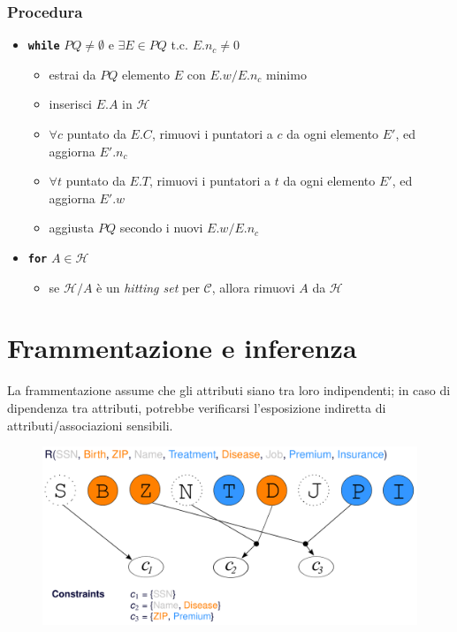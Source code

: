 \documentclass{report}
\begin{document}
\subsubsection{Procedura}
\begin{itemize}
    \item \texttt{\textbf{while}} $PQ \neq \emptyset$ e $\exists E \in PQ$ t.c. $E.n_c \neq 0$
    \begin{itemize}
        \item estrai da $PQ$ elemento $E$ con $E.w/E.n_c$ minimo 
        \item inserisci $E.A$ in $\mathcal{H}$
        \item $\forall c$ puntato da $E.C$, rimuovi i puntatori a $c$ da ogni elemento $E'$, ed aggiorna $E'.n_c$ 
        \item $\forall t$ puntato da $E.T$, rimuovi i puntatori a $t$ da ogni elemento $E'$, ed aggiorna $E'.w$
        \item aggiusta $PQ$ secondo i nuovi $E.w / E.n_c$
    \end{itemize}
    \item \texttt{\textbf{for}} $A \in \mathcal{H}$
    \begin{itemize}
        \item se $\mathcal{H} / A$ è un \textit{hitting set} per $\mathcal{C}$, 
        allora rimuovi $A$ da $\mathcal{H}$
    \end{itemize}
\end{itemize}

\newpage
\section{Frammentazione e inferenza}
La frammentazione assume che gli attributi siano tra loro indipendenti;
in caso di dipendenza tra attributi, potrebbe verificarsi l'esposizione indiretta di attributi/associazioni sensibili.

\begin{figure}[ht]
    \centering
    \includegraphics[width=1\linewidth]{images/fragmentation/inference1.png}
\end{figure}
\end{document}
